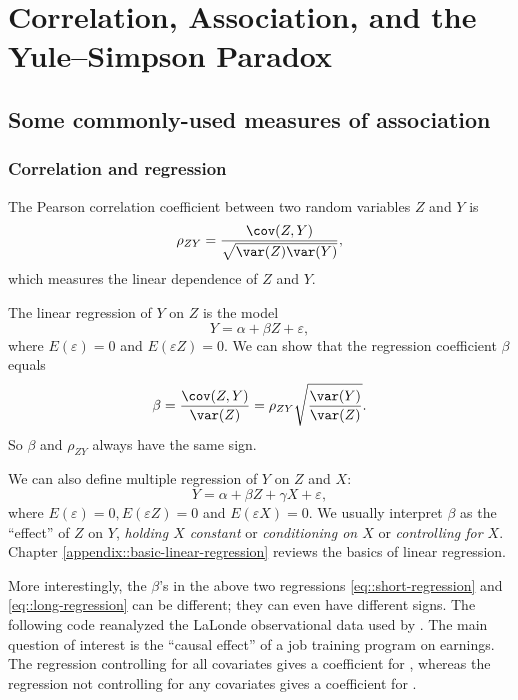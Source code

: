 
\chapter{Correlation, Association, and the Yule--Simpson Paradox}
 \label{chapter::correlationassociation}
 
 

 
\section{Some commonly-used measures of association}


\subsection{Correlation and regression}
\label{section:correlatioandregressionintro}

The Pearson correlation coefficient between two random variables $Z$ and $Y$ is
$$
\rho_{ZY} = \frac{  \cov(Z, Y)   }{   \sqrt{   \var(Z) \var(Y)   }   } ,
$$
which measures the linear dependence of $Z$ and $Y.$
 

The linear regression of $Y$ on $Z$ is the model 
\begin{equation}
Y = \alpha + \beta Z + \varepsilon ,
\label{eq::short-regression}
\end{equation} 
 where $E(   \varepsilon  ) = 0$ and $E(   \varepsilon  Z ) = 0 $. We can show that the regression coefficient $\beta$ equals  
 $$
 \beta = \frac{  \cov(Z, Y)   }{   \var(Z)    }  = \rho_{ZY}   \sqrt{     \frac{  \var(Y)     }{ \var(Z)  }    }  . 
 $$
 So $\beta$ and $\rho_{ZY} $ always have the same sign. 
 
 
We can also define multiple regression of $Y$ on $Z$ and $X$: 
\begin{equation}
 Y = \alpha  + \beta Z + \gamma  X + \varepsilon ,
 \label{eq::long-regression}
\end{equation}
 where $E( \varepsilon) = 0, E( \varepsilon Z) = 0$ and $ E( \varepsilon X) = 0$. 
We usually interpret $\beta$ as the ``effect'' of $Z$ on $Y$, {\it holding $X$ constant} or {\it conditioning on $X$} or {\it controlling for $X$}. Chapter \ref{appendix::basic-linear-regression} reviews the basics of linear regression. 

 

More interestingly, the $\beta$'s in the above two regressions \eqref{eq::short-regression} and \eqref{eq::long-regression} can be different; they can even have different signs. The following  code reanalyzed the LaLonde observational data used by \citet{hainmueller2012entropy}. The main question of interest is the ``causal effect'' of a job training program on earnings. The regression controlling for all covariates gives a  coefficient  for , whereas the regression not controlling for any covariates gives a coefficient  for . 


